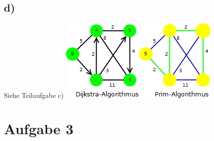 \documentclass[a4paper,11pt,twoside]{article}
\begin{document}
\subsection*{d)}
Siehe Teilaufgabe c)
\includegraphics*[scale=1]{Bilder/2c_Unterschied.png}


\section*{Aufgabe 3}
\end{document}

